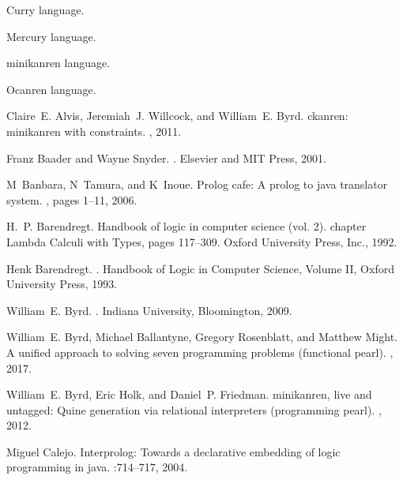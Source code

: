 %
%
\begin{thebibliography}{10}

Curry language.

Mercury language.

minikanren language.

Ocanren language.

Claire~E. Alvis, Jeremiah~J. Willcock, and William~E. Byrd.
\newblock ckanren: minikanren with constraints.
, 2011.

Franz Baader and Wayne Snyder.
.
\newblock Elsevier and MIT Press, 2001.

M~Banbara, N~Tamura, and K~Inoue.
\newblock Prolog cafe: A prolog to java translator system.
, pages 1--11,
  2006.

H.~P. Barendregt.
\newblock Handbook of logic in computer science (vol. 2).
\newblock chapter Lambda Calculi with Types, pages 117--309. Oxford University
  Press, Inc., 1992.

Henk Barendregt.
.
\newblock Handbook of Logic in Computer Science, Volume II, Oxford University
  Press, 1993.

William~E. Byrd.
.
\newblock Indiana University, Bloomington, 2009.

William~E. Byrd, Michael Ballantyne, Gregory Rosenblatt, and Matthew Might.
\newblock A unified approach to solving seven programming problems (functional
  pearl).
, 2017.

William~E. Byrd, Eric Holk, and Daniel~P. Friedman.
\newblock minikanren, live and untagged: Quine generation via relational
  interpreters (programming pearl).
, 2012.

Miguel Calejo.
\newblock Interprolog: Towards a declarative embedding of logic programming in
  java.
:714--717, 2004.


\end{thebibliography}
